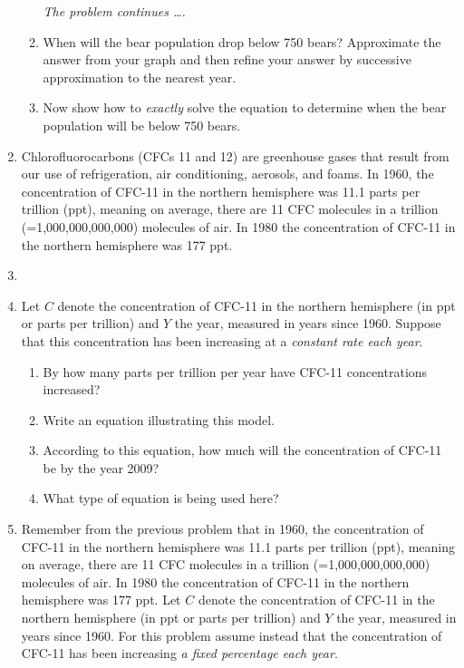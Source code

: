 \documentclass[12pt]{article}
\begin{document}
\begin{enumerate}
\begin{enumerate}
\newpage
\hspace{-.5 in}\emph{The problem continues \ldots.}

\item When will the bear population drop below 750 bears?  Approximate the answer from your graph and then refine your answer by successive approximation to the nearest year.
\vfill
\item Now show how to \textit{exactly} solve the equation to determine when the bear population will be below 750 bears.
\vfill
\end{enumerate}


\newpage

\item Chlorofluorocarbons (CFCs 11 and 12) are greenhouse gases that result from our use of refrigeration, air conditioning, aerosols, and foams.  In 1960, the concentration of CFC-11 in the northern hemisphere was 11.1 parts per trillion (ppt), meaning on average, there are 11 CFC molecules in a trillion (=1,000,000,000,000) molecules of air.  In 1980 the concentration of CFC-11 in the northern hemisphere was 177 ppt.
\item[]
\item[] Let $C$ denote the concentration of CFC-11 in the northern hemisphere (in ppt or parts per trillion) and $Y$ the year, measured in years since 1960.  Suppose that this concentration has been increasing at a \textit{constant rate each year}.

\begin{enumerate}
\item By how many parts per trillion per year have CFC-11 concentrations increased?
\vfill
\item Write an equation illustrating this model.
\vfill
\item According to this equation, how much will the concentration of CFC-11 be by the year 2009?
\vfill
\item What type of equation is being used here?
\vfill
\end{enumerate}

\newpage

\item  Remember from the previous problem that in 1960, the concentration of CFC-11 in the northern hemisphere was 11.1 parts per trillion (ppt), meaning on average, there are 11 CFC molecules in a trillion (=1,000,000,000,000) molecules of air.  In 1980 the concentration of CFC-11 in the northern hemisphere was 177 ppt.  Let $C$ denote the concentration of CFC-11 in the northern hemisphere (in ppt or parts per trillion) and $Y$ the year, measured in years since 1960.  For this problem assume instead that the concentration of CFC-11 has been increasing \textit{a fixed percentage each year}.


\end{enumerate}
\end{document}

